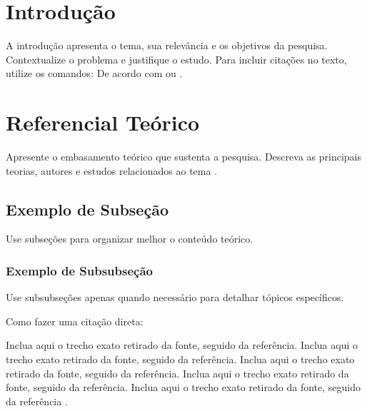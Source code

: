 \documentclass[a4paper,12pt]{article}
\begin{document}
\capaartigo
\clearpage
\contracapaartigo
\clearpage

\iniciarpaginacao
\infoartigo




\section{Introdução}

A introdução apresenta o tema, sua relevância e os objetivos da pesquisa. Contextualize o problema e justifique o estudo. Para incluir citações no texto, utilize os comandos: De acordo com  ou .

\section{Referencial Teórico}
Apresente o embasamento teórico que sustenta a pesquisa.
Descreva as principais teorias, autores e estudos relacionados ao tema \cite{nussenzveig2013}.

\subsection{Exemplo de Subseção}
Use subseções para organizar melhor o conteúdo teórico.

\subsubsection{Exemplo de Subsubseção}
Use subsubseções apenas quando necessário para detalhar tópicos específicos.

Como fazer uma citação direta:
\begin{citacaodireta}
Inclua aqui o trecho exato retirado da fonte, seguido da referência.
Inclua aqui o trecho exato retirado da fonte, seguido da referência.
Inclua aqui o trecho exato retirado da fonte, seguido da referência.
Inclua aqui o trecho exato retirado da fonte, seguido da referência.
Inclua aqui o trecho exato retirado da fonte, seguido da referência \cite[p.~5]{nussenzveig2013}.
\end{citacaodireta}
\end{document}
